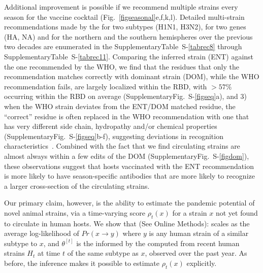 \documentclass[onecolumn, compsoc,10pt]{IEEEtran}
\def\SUPPLEMENTARY{Supplementary}
\def\METHODS{Online Methods\xspace}
\begin{document}
Additional improvement is possible if we recommend multiple strains every season for the vaccine cocktail (Fig.~\ref{figseasonal}e,f,k,l). Detailed  multi-strain recommendations made by the \enet  for two subtypes (H1N1, H3N2), for two genes (HA, NA) and for the northern and the southern hemispheres over the previous two decades are enumerated in the \SUPPLEMENTARY  Table~S-\ref{tabrec8} through \SUPPLEMENTARY Table~S-\ref{tabrec11}. Comparing the \enet inferred strain (ENT) against the one recommended by the WHO, we find that the residues that only the  \enet recommendation matches correctly with dominant strain (DOM), while the WHO recommendation fails,  are largely localized within the RBD, with $>57\%$ occurring within  the RBD on average (\SUPPLEMENTARY Fig.~S-\ref{figseq}a), and 3) when the WHO strain deviates from  the ENT/DOM   matched residue, the ``correct'' residue is often replaced  in the WHO recommendation with one that has very different side chain, hydropathy  and/or chemical properties (\SUPPLEMENTARY Fig.~S-\ref{figseq}b-f), suggesting deviations in recognition characteristics~\cite{carugo2001normalized,righetto2014comparative}. Combined with the fact that we find circulating strains are almost always within a few edits of the DOM (\SUPPLEMENTARY Fig.~S-\ref{figdom}), these observations suggest that  hosts vaccinated with the ENT recommendation is more likely to have season-specific antibodies that are more likely to recognize a larger cross-section of the circulating strains.

Our primary claim, however,  is the ability to estimate the pandemic potential of novel animal strains, via a  time-varying \erisk score $\rho_t(x)$ for a strain $x$ not yet found to circulate in human hosts. We show that (See \METHODS):%
%
scales as the average log-likelihood of $Pr(x \rightarrow y)$ where $y$ is any human strain of a similar subtype to $x$, and  $\theta^{[t]}$ is the \qdist informed by the \enet computed from recent human strains $H_t$ at time $t$ of the same subtype as $x$, observed over the past year. As before, the \enet inference makes it possible to estimate $\rho_t(x)$ explicitly. 
\end{document}
